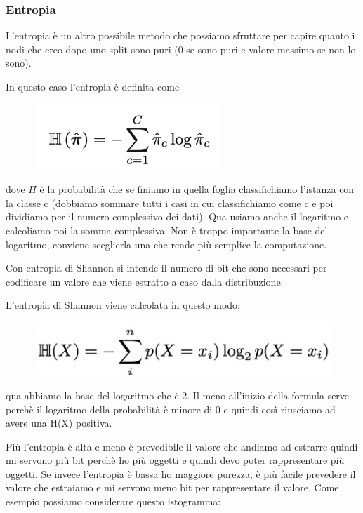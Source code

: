 \documentclass[14pt]{extreport}
\begin{document}
\subsubsection{Entropia}

L’entropia è un altro possibile metodo che possiamo sfruttare per capire quanto i nodi che creo dopo uno split sono puri (0 se sono puri e valore
massimo se non lo sono).

In questo caso l’entropia è definita come

\begin{figure}[H]
	\centering
	\includegraphics[width=0.7\linewidth]{585.jpeg}
\end{figure}
dove $\Pi$ è la probabilità che se finiamo in quella foglia classifichiamo l’istanza con la classe c (dobbiamo sommare tutti i casi in cui
classifichiamo come c e poi dividiamo per il numero complessivo dei dati). Qua usiamo anche il logaritmo e calcoliamo poi la somma complessiva. Non è
troppo importante la base del logaritmo, conviene sceglierla una che rende più semplice la computazione.

Con entropia di Shannon si intende il numero di bit che sono necessari per codificare un valore che viene estratto a caso dalla distribuzione.

L’entropia di Shannon viene calcolata in questo modo:


\begin{figure}[H]
	\centering
	\includegraphics[width=0.7\linewidth]{586.jpeg}
\end{figure}

qua abbiamo la base del logaritmo che è 2. Il meno all’inizio della formula serve perchè il logaritmo della probabilità è minore di 0 e quindi così
riusciamo ad avere una H(X) positiva.

Più l’entropia è alta e meno è prevedibile il valore che andiamo ad estrarre quindi mi servono più bit perchè ho più oggetti e quindi devo poter
rappresentare più oggetti. Se invece l’entropia è bassa ho maggiore purezza, è più facile prevedere il valore che estraiamo e mi servono meno bit per
rappresentare il valore. Come esempio possiamo considerare questo istogramma:
\end{document}
